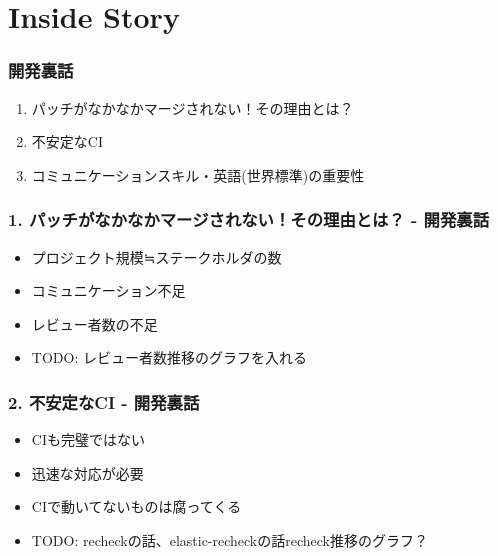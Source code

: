 \documentclass[aspectratio=169,11pt,hyperref={colorlinks=true}]{beamer}
\begin{document}
\section{Inside Story}
\begin{frame}
  \frametitle{開発裏話}
  \begin{enumerate}
    \item パッチがなかなかマージされない！その理由とは？
    \item 不安定なCI
    \item コミュニケーションスキル・英語(世界標準)の重要性
  \end{enumerate}
\end{frame}

\begin{frame}
  \frametitle{1. パッチがなかなかマージされない！その理由とは？ - 開発裏話}
  \begin{itemize}
    \item プロジェクト規模≒ステークホルダの数
    \item コミュニケーション不足
    \item レビュー者数の不足
    \item TODO: レビュー者数推移のグラフを入れる
  \end{itemize}
\end{frame}

\begin{frame}
  \frametitle{2. 不安定なCI - 開発裏話}
  \begin{itemize}
    \item CIも完璧ではない
    \item 迅速な対応が必要
    \item CIで動いてないものは腐ってくる
    \item TODO: recheckの話、elastic-recheckの話recheck推移のグラフ？
  \end{itemize}
\end{frame}
\end{document}
